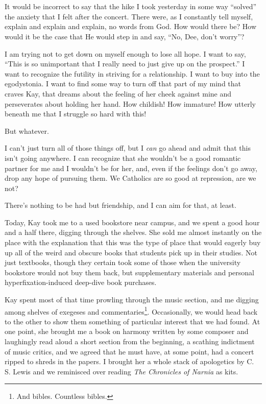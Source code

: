 \section{}

It would be incorrect to say that the hike I took yesterday in some way ``solved'' the anxiety that I felt after the concert. There were, as I constantly tell myself, explain and explain and explain, no words from God. How would there be? How would it be the case that He would step in and say, ``No, Dee, don't worry''?

I am trying not to get down on myself enough to lose all hope. I want to say, ``This is so unimportant that I really need to just give up on the prospect.'' I want to recognize the futility in striving for a relationship. I want to buy into the egodystonia. I want to find some way to turn off that part of my mind that craves Kay, that dreams about the feeling of her cheek against mine and perseverates about holding her hand. How childish! How immature! How utterly beneath me that I struggle so hard with this!

But whatever.

I can't just turn all of those things off, but I \emph{can} go ahead and admit that this isn't going anywhere. I can recognize that she wouldn't be a good romantic partner for me and I wouldn't be for her, and, even if the feelings don't go away, drop any hope of pursuing them. We Catholics are so good at repression, are we not?

There's nothing to be had but friendship, and I can aim for that, at least.

Today, Kay took me to a used bookstore near campus, and we spent a good hour and a half there, digging through the shelves. She sold me almost instantly on the place with the explanation that this was the type of place that would eagerly buy up all of the weird and obscure books that students pick up in their studies. Not just textbooks, though they certain took some of those when the university bookstore would not buy them back, but supplementary materials and personal hyperfixation-induced deep-dive book purchases.

Kay spent most of that time prowling through the music section, and me digging among shelves of exegeses and commentaries\footnote{And bibles. Countless bibles.}. Occasionally, we would head back to the other to show them something of particular interest that we had found. At one point, she brought me a book on harmony written by some composer and laughingly read aloud a short section from the beginning, a scathing indictment of music critics, and we agreed that he must have, at some point, had a concert ripped to shreds in the papers. I brought her a whole stack of apologetics by C. S. Lewis and we reminisced over reading \emph{The Chronicles of Narnia} as kits.

